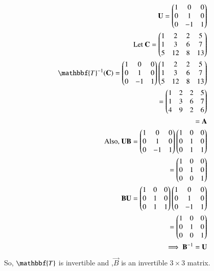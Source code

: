 \documentclass[journal,12pt,twocolumn]{IEEEtran}
\begin{document}
\begin{align}
\vec{U}=\myvec{1&0&0\\0&1&0\\0&-1&1}\\
     \text{Let }\vec{C}=\myvec{1&2&2&5\\1&3&6&7\\5&12&8&13}\\
     \mathbbf{T}^{-1}(\vec{C})=\myvec{1&0&0\\0&1&0\\0&-1&1}\myvec{1&2&2&5\\1&3&6&7\\5&12&8&13}\\
     =\myvec{1&2&2&5\\1&3&6&7\\4&9&2&6}\\=\vec{A}\\
     \text{Also,  } \vec{U}\vec{B}=\myvec{1&0&0\\0&1&0\\0&-1&1}\myvec{1&0&0\\0&1&0\\0&1&1}\\
     =\myvec{1&0&0\\0&1&0\\0&0&1}\\
     \vec{B}\vec{U}=\myvec{1&0&0\\0&1&0\\0&1&1}\myvec{1&0&0\\0&1&0\\0&-1&1}\\=\myvec{1&0&0\\0&1&0\\0&0&1}\\
     \implies \vec{B}^{-1}=\vec{U}
\end{align}
So, $\mathbbf{T}$ is invertible and ,$\vec{B}$ is an invertible $3 \times 3$ matrix.
\end{document}
